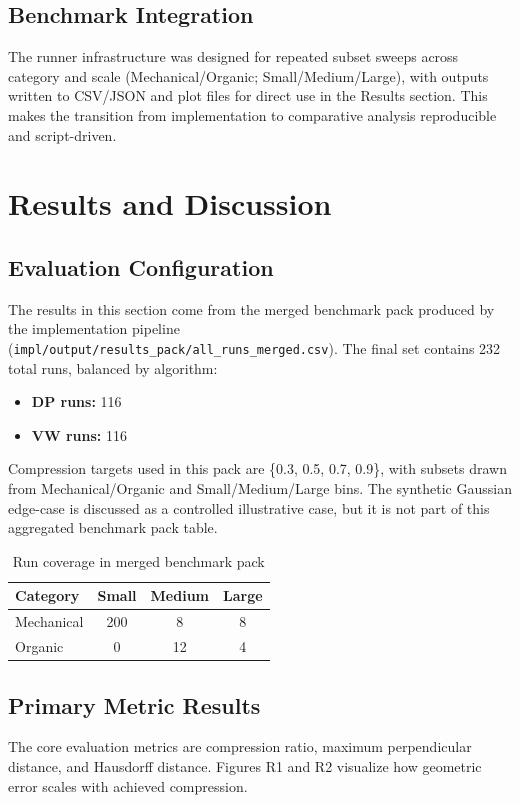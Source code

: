 \documentclass[12pt]{article}
\begin{document}
\subsection{Benchmark Integration}
The runner infrastructure was designed for repeated subset sweeps across category and scale (Mechanical/Organic; Small/Medium/Large), with outputs written to CSV/JSON and plot files for direct use in the Results section. This makes the transition from implementation to comparative analysis reproducible and script-driven.

\section{Results and Discussion}
\subsection{Evaluation Configuration}
The results in this section come from the merged benchmark pack produced by the implementation pipeline (\texttt{impl/output/results\_pack/all\_runs\_merged.csv}). The final set contains 232 total runs, balanced by algorithm:
\begin{itemize}
    \item \textbf{DP runs:} 116
    \item \textbf{VW runs:} 116
\end{itemize}
Compression targets used in this pack are \{0.3, 0.5, 0.7, 0.9\}, with subsets drawn from Mechanical/Organic and Small/Medium/Large bins.
The synthetic Gaussian edge-case is discussed as a controlled illustrative case, but it is not part of this aggregated benchmark pack table.

\begin{table}[H]
\centering
\caption{Run coverage in merged benchmark pack}
\vspace{0.5em}
\begin{tabular}{lccc}
\toprule
\textbf{Category} & \textbf{Small} & \textbf{Medium} & \textbf{Large} \\
\midrule
Mechanical & 200 & 8 & 8 \\
Organic & 0 & 12 & 4 \\
\bottomrule
\end{tabular}
\end{table}

\subsection{Primary Metric Results}
The core evaluation metrics are compression ratio, maximum perpendicular distance, and Hausdorff distance. Figures R1 and R2 visualize how geometric error scales with achieved compression.
\end{document}
